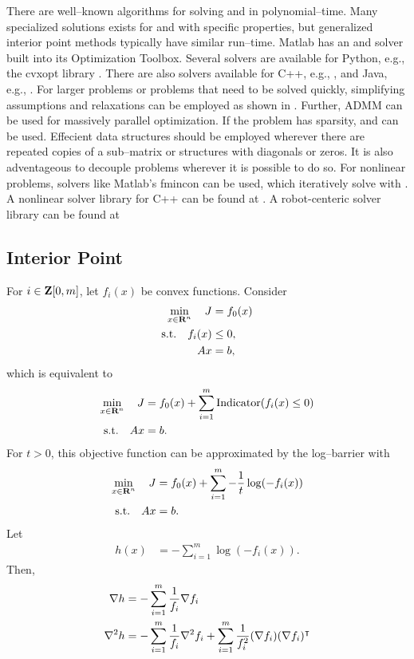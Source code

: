 \documentclass{article}
\begin{document}
    There are well--known algorithms for solving \LP and \QP in polynomial--time.
    Many specialized solutions exists for \LP and \QP with specific properties,
    but generalized interior point methods \cite[p.~569]{bv_cvxbook} typically have similar run--time.
    Matlab has an \LP \cite{matlab_lp} and \QP \cite{matlab_qp} 
    solver built into its Optimization Toolbox.
    Several \QP solvers are available for Python, e.g.,
    the cvxopt library \cite{cvx_opt}.
    There are also \QP solvers available for C++, e.g., \cite{cpp_qp},
    and Java, e.g., \cite{java_qp}. For larger problems or problems that need to be solved quickly,  
    simplifying assumptions and relaxations can be employed as shown in \cite{l1l2}.
    Further, ADMM \cite{admm} can be used for massively parallel optimization.
    If the problem has sparsity, \cite{sparse} and \cite{sparse_lp} can be used.
    Effecient data structures should be employed
    wherever there are repeated copies of a sub--matrix 
    or structures with diagonals or zeros.  
    It is also adventageous to decouple problems wherever it is possible to do so.
    For nonlinear problems, solvers like Matlab's fmincon \cite{matlab_fmincon}
    can be used, which iteratively solve with \QP.
    A nonlinear solver library for C++ can be found at \cite{ceres}.
    A robot-centeric solver library can be found at \cite{roboptim}

\subsection{Interior Point}

    For $i\in\textbf{Z}[0,m]$, let $f_i(x)$ be convex functions.  Consider
    \begin{align*}
        \min_{x\in\textbf{R}^n}\quad J&=f_0(x)\\
        \text{s.t.}\quad f_i(x)&\leq 0,\\
        A x &= b,
    \end{align*}
    which is equivalent to
    \begin{align*}
        \min_{x\in\textbf{R}^n}\quad J&=f_0(x)+\sum_{i=1}^{m} \text{Indicator}(f_i(x)\leq 0)\\
        \text{s.t.}\quad A x &= b.
    \end{align*}
    For $t>0$, this objective function can be approximated by the log--barrier with
    \begin{align*}
        \min_{x\in\textbf{R}^n}\quad J&=f_0(x)+\sum_{i=1}^{m} -\frac{1}{t}\log(-f_i(x))\\
        \text{s.t.}\quad A x &= b.
    \end{align*}
    Let
    \begin{align}
        h(x)&=-\sum_{i=1}^m \log(-f_i(x)).\label{eqn:log_barrier}
    \end{align}
    Then,
    \begin{align*}
        \nabla h &= -\sum_{i=1}^m \frac{1}{f_i}\nabla f_i\\
        \nabla^2 h &= -\sum_{i=1}^m \frac{1}{f_i}\nabla^2 f_i+
        \sum_{i=1}^m \frac{1}{f_i^2}(\nabla f_i)(\nabla f_i)^\intercal        
    \end{align*}
\end{document}
